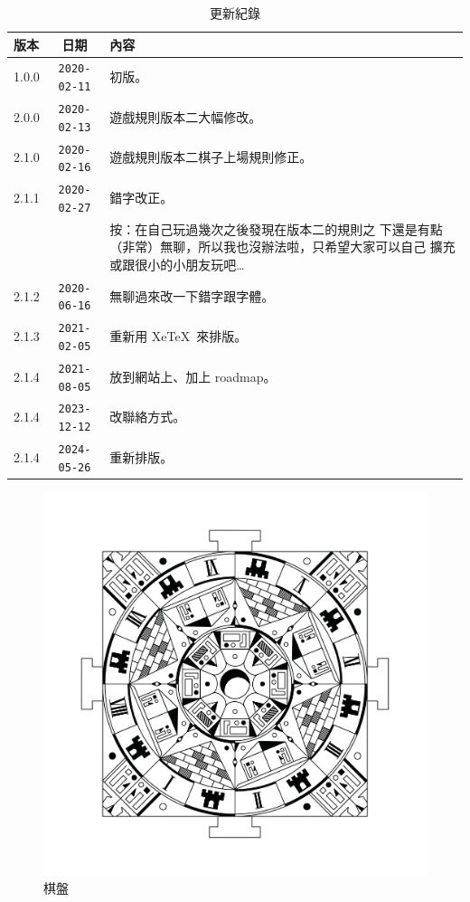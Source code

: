 \documentclass[11pt,a4paper]{article}
\begin{document}
\begin{table} 
	\caption{更新紀錄}
	\label{update}
	\centering
	\vspace{0.1cm}
	\begin{tabular}{lcp{9cm}}
		\toprule
			版本 & 日期 & 內容 \\
		\midrule
			1.0.0 & \texttt{2020-02-11} & 初版。                           \\
			2.0.0 & \texttt{2020-02-13} & 遊戲規則版本二大幅修改。         \\
			2.1.0 & \texttt{2020-02-16} & 遊戲規則版本二棋子上場規則修正。 \\
			2.1.1 & \texttt{2020-02-27} & 錯字改正。                       \\
                  &                & 按：在自己玩過幾次之後發現在版本二的規則之
				  下還是有點（非常）無聊，所以我也沒辦法啦，只希望大家可以自己
				  擴充或跟很小的小朋友玩吧… \\
			2.1.2 & \texttt{2020-06-16} & 無聊過來改一下錯字跟字體。       \\
			2.1.3 & \texttt{2021-02-05} & 重新用 Xe\TeX\ 來排版。 \\
			2.1.4 & \texttt{2021-08-05} & 放到網站上、加上 roadmap。 \\
			2.1.4 & \texttt{2023-12-12} & 改聯絡方式。 \\
			2.1.4 & \texttt{2024-05-26} & 重新排版。 \\
		\bottomrule
	\end{tabular}
\end{table}

\begin{figure}
	\caption{棋盤}
	\label{a}
	\centerline{ \includegraphics[scale = 0.4]{mandala-remastered} }
\end{figure}
\end{document}
